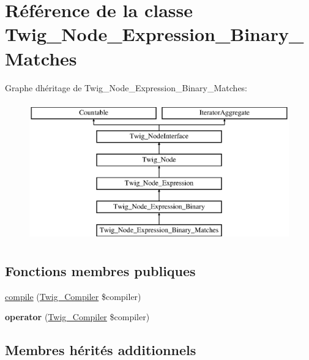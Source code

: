 \hypertarget{class_twig___node___expression___binary___matches}{}\section{Référence de la classe Twig\+\_\+\+Node\+\_\+\+Expression\+\_\+\+Binary\+\_\+\+Matches}
\label{class_twig___node___expression___binary___matches}
Graphe d\textquotesingle{}héritage de Twig\+\_\+\+Node\+\_\+\+Expression\+\_\+\+Binary\+\_\+\+Matches\+:\begin{figure}[H]
\begin{center}
\leavevmode
\includegraphics[height=6.000000cm]{class_twig___node___expression___binary___matches}
\end{center}
\end{figure}
\subsection*{Fonctions membres publiques}
\begin{DoxyCompactItemize}
\item 
\hyperlink{class_twig___node___expression___binary___matches_a4e0faa87c3fae583620b84d3607085da}{compile} (\hyperlink{class_twig___compiler}{Twig\+\_\+\+Compiler} \$compiler)
\item 
{\bfseries operator} (\hyperlink{class_twig___compiler}{Twig\+\_\+\+Compiler} \$compiler)\hypertarget{class_twig___node___expression___binary___matches_af77318ec88d5f8a508684970a150b670}{}\label{class_twig___node___expression___binary___matches_af77318ec88d5f8a508684970a150b670}

\end{DoxyCompactItemize}
\subsection*{Membres hérités additionnels}


